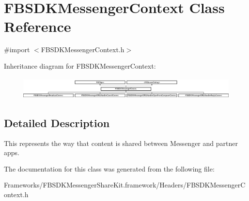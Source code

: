 \hypertarget{interface_f_b_s_d_k_messenger_context}{}\section{F\+B\+S\+D\+K\+Messenger\+Context Class Reference}
\label{interface_f_b_s_d_k_messenger_context}


{\ttfamily \#import $<$F\+B\+S\+D\+K\+Messenger\+Context.\+h$>$}

Inheritance diagram for F\+B\+S\+D\+K\+Messenger\+Context\+:\begin{figure}[H]
\begin{center}
\leavevmode
\includegraphics[height=1.196581cm]{interface_f_b_s_d_k_messenger_context}
\end{center}
\end{figure}


\subsection{Detailed Description}
This represents the way that content is shared between Messenger and partner apps. 

The documentation for this class was generated from the following file\+:\begin{DoxyCompactItemize}
\item 
Frameworks/\+F\+B\+S\+D\+K\+Messenger\+Share\+Kit.\+framework/\+Headers/F\+B\+S\+D\+K\+Messenger\+Context.\+h\end{DoxyCompactItemize}
